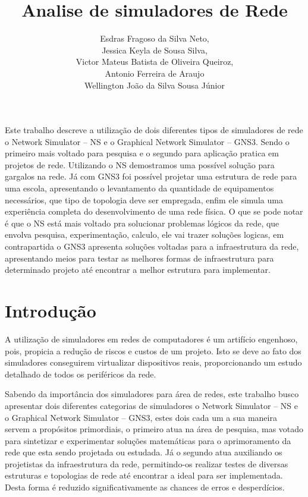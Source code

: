 \documentclass[12pt]{article}
\title{Analise de simuladores de Rede \\ }
\author{ Esdras Fragoso da Silva Neto, \\ Jessica Keyla de Sousa Silva, \\
Victor Mateus Batista de Oliveira Queiroz, \\ Antonio Ferreira de Araujo\\ 	Wellington João da Silva Sousa Júnior}
\begin{document}
 

\maketitle


     
\begin{resumo} 
  Este trabalho descreve a utilização de dois diferentes tipos de simuladores de rede o Network Simulator – NS e o Graphical Network Simulator – GNS3. Sendo o primeiro mais voltado para pesquisa e o segundo para aplicação pratica em projetos de rede.  Utilizando o NS demostramos uma possível solução para gargalos na rede.  Já com GNS3 foi possível projetar uma estrutura de rede para uma escola, apresentando o levantamento da quantidade de equipamentos necessários, que tipo de topologia deve ser empregada, enfim ele simula uma experiência completa do desenvolvimento de uma rede física. O que se pode notar é que o NS está mais voltado pra solucionar problemas lógicos da rede, que envolva pesquisa, experimentação, calculo, ele vai trazer soluções logicas, em contrapartida o GNS3 apresenta soluções voltadas para a infraestrutura da rede, apresentando meios para testar as melhores formas de infraestrutura para determinado projeto até encontrar a melhor estrutura para implementar.    
\end{resumo}


\section{Introdução}
A utilização de simuladores em redes de computadores é um artifício engenhoso, pois, propicia a redução de riscos e custos de um projeto. Isto se deve ao fato dos simuladores conseguirem virtualizar dispositivos reais, proporcionando um estudo detalhado de  todos os periféricos da rede.

Sabendo da importância dos simuladores para área de redes, este trabalho busco apresentar dois diferentes categorias de simuladores o Network Simulator – NS e o Graphical Network Simulator – GNS3, estes dois cada um a sua maneira servem a propósitos primordiais, o primeiro atua na área de pesquisa, mas votado para sintetizar e experimentar soluções matemáticas para o aprimoramento da rede que esta sendo projetada ou estudada. Já o segundo atua auxiliando os projetistas da infraestrutura da rede, permitindo-os realizar testes de diversas estruturas e topologias de rede até encontrar a ideal para ser implementada. Desta forma é reduzido significativamente as chances de erros e desperdícios. 
\end{document}
